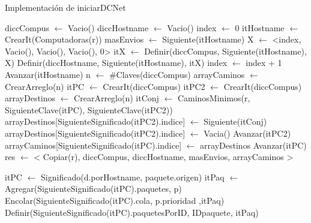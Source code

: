 \begin{Algoritmos}
\begin{algorithm}
\caption{Implementaci\'on de iniciarDCNet}
\begin{algorithmic}[0]
	\State diccCompus $\gets$ Vacio()  
	\State diccHostname $\gets$ Vacio()  
	\State index $\gets$  0 
	\State itHostname $\gets$  CrearIt(Computadoras(r)) 
	\State masEnvios $\gets$ Siguiente(itHostname) 
	 
		\State X $\gets$ <index, Vacio(), Vacio(), Vacio(), 0> 
		\State itX $\gets$ Definir(diccCompus, Siguiente(itHostname), X)   
		\State Definir(diccHostname, Siguiente(itHostname), itX)   
		\State index $\gets$ index + 1 
		\State Avanzar(itHostname) 
	\EndWhile
	\State n $\gets$ \#Claves(diccCompus) 
	\State arrayCaminos $\gets$ CrearArreglo(n) 
	\State itPC $\gets$ CrearIt(diccCompus) 
	\State itPC2 $\gets$ CrearIt(diccCompus) 				 	 	
	 
		\State arrayDestinos $\gets$ CrearArreglo(n) 
		 
			\State itConj $\gets$ CaminosMinimos(r, SiguienteClave(itPC), SiguienteClave(itPC2)) 
				\State arrayDestinos[SiguienteSignificado(itPC2).indice] $\gets$ Siguiente(itConj) 
			\Else 
				\State arrayDestinos[SiguienteSignificado(itPC2).indice] $\gets$ Vacia() 
			\EndIf
			\State Avanzar(itPC2) 
		\EndWhile
		\State arrayCaminos[SiguienteSignificado(itPC).indice] $\gets$ arrayDestinos 
		\State Avanzar(itPC) 
	\EndWhile	
	\State res $\gets$ < Copiar(r), diccCompus, diccHostname, masEnvios, arrayCaminos > 

\EndFunction
\end{algorithmic}
\end{algorithm}

\begin{algorithm}
\caption{}
\begin{algorithmic}[0]
	\State itPC $\gets$ Significado(d.porHostname, paquete.origen)
	\State itPaq $\gets$ Agregar(SiguienteSignificado(itPC).paquetes, p)
	\State Encolar(SiguienteSignificado(itPC).cola, p.prioridad ,itPaq)	
	\State Definir(SiguienteSignificado(itPC).paquetesPorID, IDpaquete, itPaq) 
\EndFunction
\end{algorithmic}
\end{algorithm}


\end{Algoritmos}
